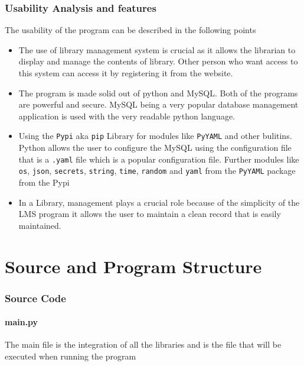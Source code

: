 \documentclass[12pt, a4paper, titlepage, openany]{report}
\begin{document}
\section{Usability Analysis and features}
The usability of the program can be described in the following points
\begin{itemize}
\item The use of library management system is crucial as it allows the librarian to display and manage the contents of library. Other person who want access to this system can access it by registering it from the website.
\item The program is made solid out of python and MySQL. Both of the programs are powerful and secure. MySQL being a very popular database management application is used with the very readable python language.

\item Using the \verb+Pypi+ aka \verb+pip+ Library for modules like \verb+PyYAML+ and other bulitins. Python allows the user to configure the MySQL using the configuration file that is a \verb+.yaml+ file which is a popular configuration file. Further modules like \verb+os+, \verb+json+, \verb+secrets+, \verb+string+, \verb+time+, \verb+random+ and \verb+yaml+ from the \verb+PyYAML+ package from the Pypi 
\item In a Library, management plays a crucial role because of the simplicity of the LMS program it allows the user to maintain a clean record that is easily maintained.

\end{itemize}



\newpage
\part{Source and Program Structure}
\section{Source Code}

\subsection{main.py}	

The main file is the integration of all the libraries and is the file that will be executed when running the program \par

\newpage
\end{document}
